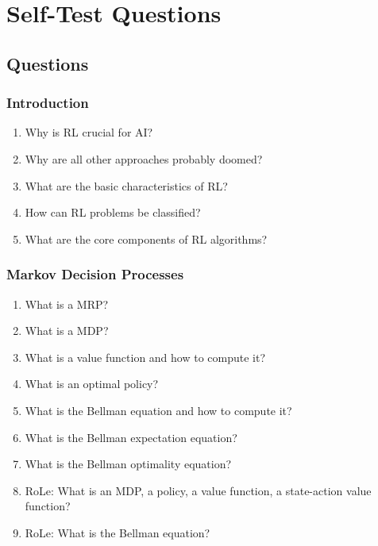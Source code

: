 \chapter{Self-Test Questions}
	\section{Questions}
		\subsection{Introduction}
			\begin{enumerate}
				\item Why is \ac{RL} crucial for \ac{AI}?
				\item Why are all other approaches probably doomed?
				\item What are the basic characteristics of \ac{RL}?
				\item How can \ac{RL} problems be classified?
				\item What are the core components of \ac{RL} algorithms?
			\end{enumerate}

		\subsection{Markov Decision Processes}
			\begin{enumerate}
				\item What is a \ac{MRP}?
				\item What is a \ac{MDP}?
				\item What is a value function and how to compute it?
				\item What is an optimal policy?
				\item What is the Bellman equation and how to compute it?
				\item What is the Bellman expectation equation?
				\item What is the Bellman optimality equation?
				\item RoLe: What is an \ac{MDP}, a policy, a value function, a state-action value function?
				\item RoLe: What is the Bellman equation?
			\end{enumerate}

